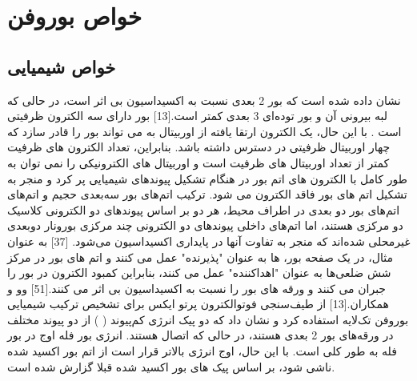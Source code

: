 \section{خواص بوروفن}
\subsection{خواص شیمیایی}
نشان داده شده است که بور 2 بعدی نسبت به اکسیداسیون بی اثر است، در حالی که لبه بیرونی آن و بور توده‌ای 3 بعدی کمتر است.\cite{fengExperimentalRealizationTwodimensional2016}[13] بور دارای سه الکترون ظرفیتی است . با این حال، یک الکترون ارتقا یافته از اوربیتال  به  می تواند بور را قادر سازد که چهار اوربیتال ظرفیتی در دسترس داشته باشد. بنابراین، تعداد الکترون های ظرفیت کمتر از تعداد اوربیتال های ظرفیت است و اوربیتال های الکترونیکی را نمی توان به طور کامل با الکترون های اتم بور در هنگام تشکیل پیوندهای شیمیایی پر کرد و منجر به تشکیل اتم های بور فاقد الکترون می شود. ترکیب اتم‌های بور سه‌بعدی حجیم و اتم‌های اتم‌های بور دو بعدی در اطراف محیط، هر دو بر اساس پیوندهای دو الکترونی کلاسیک دو مرکزی هستند، اما اتم‌های داخلی پیوندهای دو الکترونی چند مرکزی بورونار دوبعدی غیرمحلی شده‌اند که منجر به تفاوت آنها در پایداری اکسیداسیون می‌شود. \cite{zhangTwodimensionalBoronStructures2017}[37] به عنوان مثال، در یک صفحه بور، ‌ها به عنوان "پذیرنده" عمل می کنند و اتم های بور در مرکز شش ضلعی‌ها به عنوان "اهداکننده" عمل می کنند، بنابراین کمبود الکترون در بور را جبران می کنند و ورقه های بور را نسبت به اکسیداسیون بی اثر می کنند.[51] وو و همکاران.\cite{fengExperimentalRealizationTwodimensional2016}[13] از طیف‌سنجی فوتوالکترون پرتو ایکس  برای تشخیص ترکیب شیمیایی بوروفن تک‌لایه استفاده کرد و نشان داد که دو پیک انرژی کم‌پیوند ( ) از دو پیوند  مختلف در ورقه‌های بور 2 بعدی هستند، در حالی که اتصال هستند. انرژی بور فله  اوج در بور فله  به طور کلی  است. با این حال، اوج انرژی بالاتر  قرار است از اتم بور اکسید شده ناشی شود، بر اساس پیک های بور اکسید شده قبلا گزارش شده است.
  
